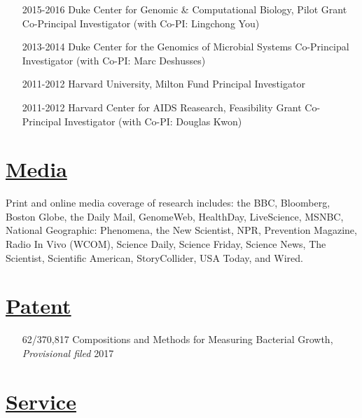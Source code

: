 \documentclass[overlapped,line,11pt]{res}
\begin{document}
\begin{resume}
\begin{itemize}[leftmargin=2cm, style=sameline]
\item[2015-2016] Duke Center for Genomic \& Computational Biology, Pilot Grant
  \newline Co-Principal Investigator (with Co-PI:
  Lingchong You)

\item[2013-2014] Duke Center for the Genomics of Microbial Systems
  \newline Co-Principal Investigator (with Co-PI:
  Marc Deshusses)

\item[2011-2012] Harvard University, Milton Fund \newline
  Principal Investigator

\item[2011-2012] Harvard Center for AIDS Reasearch, Feasibility Grant \newline
  Co-Principal Investigator (with Co-PI: Douglas Kwon)

\end{itemize}

\section{\underline{\sc Media}} 
\vspace{.05in} Print and online media coverage of research includes:
the BBC, Bloomberg, Boston Globe, the Daily Mail, GenomeWeb,
HealthDay, LiveScience, MSNBC, National Geographic: Phenomena, the New
Scientist, NPR, Prevention Magazine, Radio In Vivo (WCOM), Science
Daily, Science Friday, Science News, The Scientist, Scientific
American, StoryCollider, USA Today, and Wired.

\section{\underline{\sc Patent}} 
\vspace{.25in} 
\begin{itemize}[leftmargin=2cm, style=sameline, itemsep=0mm]
\item[62/370,817] Compositions and Methods for Measuring Bacterial
  Growth, \emph{Provisional filed} 2017
\end{itemize}


\section{\underline{\sc Service}}
\vspace{.05in}


\end{resume}
\end{document}
